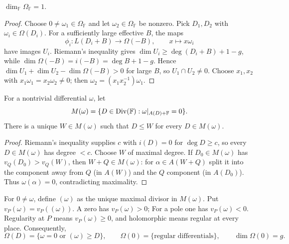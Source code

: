 \begin{theorem}
\label{par-thm-differentials-one-dimensional}
\uses{}
$\dim_{\mathbb F}\Omega_{\mathbb F}=1$.
\end{theorem}
\begin{proof}
Choose $0\neq\omega_1\in\Omega_{\mathbb F}$ and let
$\omega_2\in\Omega_{\mathbb F}$ be nonzero. Pick $D_1,D_2$ with
$\omega_i\in\Omega(D_i)$. For a sufficiently large effective $B$, the maps
\[
\phi_i:L(D_i+B)\to\Omega(-B),\qquad x\mapsto x\omega_i
\]
have images $U_i$. Riemann's inequality gives
$\dim U_i\geq\deg(D_i+B)+1-g$, while
$\dim\Omega(-B)=i(-B)=\deg B+1-g$. Hence
$\dim U_1+\dim U_2-\dim\Omega(-B)>0$ for large $B$, so $U_1\cap U_2\neq0$.
Choose $x_1,x_2$ with $x_1\omega_1=x_2\omega_2\neq0$; then
$\omega_2=(x_1x_2^{-1})\omega_1$.
\end{proof}

\begin{lemma}
\label{par-lem-differential-max-divisor}
\uses{}
For a nontrivial differential $\omega$, let
\[
M(\omega)=\{D\in\operatorname{Div}(\mathbb F):\omega|_{A(D)+\mathbb F}=0\}.
\]
There is a unique $W\in M(\omega)$ such that $D\leq W$ for every $D\in M(\omega)$.
\end{lemma}
\begin{proof}
Riemann's inequality supplies $c$ with $i(D)=0$ for $\deg D\geq c$, so every
$D\in M(\omega)$ has degree $<c$. Choose $W$ of maximal degree. If
$D_0\in M(\omega)$ has $v_Q(D_0)>v_Q(W)$, then $W+Q\in M(\omega)$: for
$\alpha\in A(W+Q)$ split it into the component away from $Q$ (in $A(W)$) and
the $Q$ component (in $A(D_0)$). Thus $\omega(\alpha)=0$, contradicting maximality.
\end{proof}

\begin{definition}
\label{par-def-differential-divisor}
\uses{}
For $0\neq\omega$, define $(\omega)$ as the unique maximal divisor in
$M(\omega)$. Put $v_P(\omega)=v_P((\omega))$. A zero has $v_P(\omega)>0$;
For a pole one has $v_P(\omega)<0$. Regularity at $P$ means
$v_P(\omega)\geq0$, and holomorphic means regular at every place. Consequently,
\[
\Omega(D)=\{\omega=0\text{ or }(\omega)\geq D\},\qquad
\Omega(0)=\{\text{regular differentials}\},\qquad\dim\Omega(0)=g.
\]
\end{definition}

